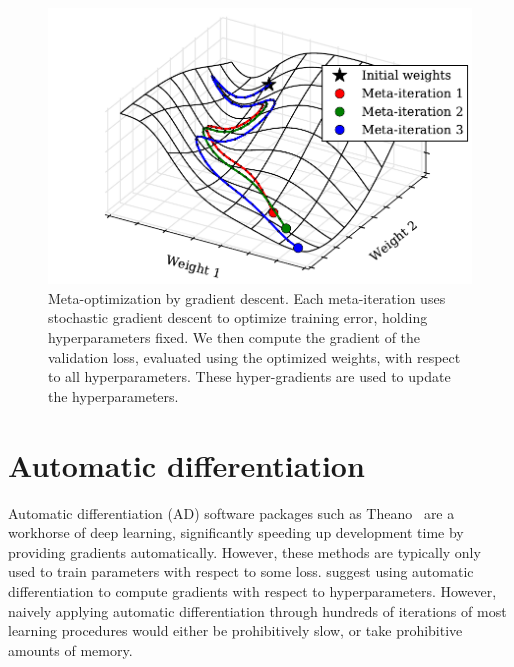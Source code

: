 \documentclass{article}
\begin{document}
\begin{figure}[ht]
\vskip 0.2in
\begin{center}
\includegraphics[width=\columnwidth]{../experiments/Jan_25_Figure_1/2/learning_curves.pdf}
\caption{Meta-optimization by gradient descent.
Each meta-iteration uses stochastic gradient descent to optimize training error, holding hyperparameters fixed.
We then compute the gradient of the validation loss, evaluated using the optimized weights, with respect to all hyperparameters.
These hyper-gradients are used to update the hyperparameters.}
\label{fig:chaos}
\end{center}
\vskip -0.2in
\end{figure} 


\section{Automatic differentiation}

Automatic differentiation (AD) software packages such as Theano~\cite{Bastien-Theano-2012, bergstra2010scipy} are a workhorse of deep learning, significantly speeding up development time by providing gradients automatically.
However, these methods are typically only used to train parameters with respect to some loss.
\citet{Autodiff14} suggest using automatic differentiation to compute gradients with respect to hyperparameters.
However, naively applying automatic differentiation through hundreds of iterations of most learning procedures would either be prohibitively slow, or take prohibitive amounts of memory.
\end{document}
